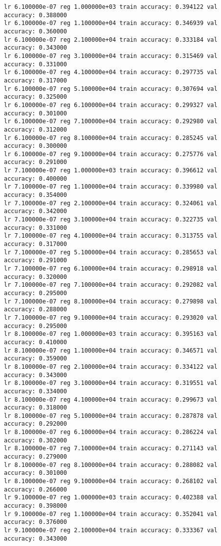 \documentclass[11pt]{article}
\begin{document}
\begin{Verbatim}[commandchars=\\\{\}]
lr 6.100000e-07 reg 1.000000e+03 train accuracy: 0.394122 val accuracy: 0.388000
lr 6.100000e-07 reg 1.100000e+04 train accuracy: 0.346939 val accuracy: 0.360000
lr 6.100000e-07 reg 2.100000e+04 train accuracy: 0.333184 val accuracy: 0.343000
lr 6.100000e-07 reg 3.100000e+04 train accuracy: 0.315469 val accuracy: 0.331000
lr 6.100000e-07 reg 4.100000e+04 train accuracy: 0.297735 val accuracy: 0.317000
lr 6.100000e-07 reg 5.100000e+04 train accuracy: 0.307694 val accuracy: 0.325000
lr 6.100000e-07 reg 6.100000e+04 train accuracy: 0.299327 val accuracy: 0.301000
lr 6.100000e-07 reg 7.100000e+04 train accuracy: 0.292980 val accuracy: 0.312000
lr 6.100000e-07 reg 8.100000e+04 train accuracy: 0.285245 val accuracy: 0.300000
lr 6.100000e-07 reg 9.100000e+04 train accuracy: 0.275776 val accuracy: 0.291000
lr 7.100000e-07 reg 1.000000e+03 train accuracy: 0.396612 val accuracy: 0.400000
lr 7.100000e-07 reg 1.100000e+04 train accuracy: 0.339980 val accuracy: 0.354000
lr 7.100000e-07 reg 2.100000e+04 train accuracy: 0.324061 val accuracy: 0.342000
lr 7.100000e-07 reg 3.100000e+04 train accuracy: 0.322735 val accuracy: 0.331000
lr 7.100000e-07 reg 4.100000e+04 train accuracy: 0.313755 val accuracy: 0.317000
lr 7.100000e-07 reg 5.100000e+04 train accuracy: 0.285653 val accuracy: 0.291000
lr 7.100000e-07 reg 6.100000e+04 train accuracy: 0.298918 val accuracy: 0.320000
lr 7.100000e-07 reg 7.100000e+04 train accuracy: 0.292082 val accuracy: 0.295000
lr 7.100000e-07 reg 8.100000e+04 train accuracy: 0.279898 val accuracy: 0.288000
lr 7.100000e-07 reg 9.100000e+04 train accuracy: 0.293020 val accuracy: 0.295000
lr 8.100000e-07 reg 1.000000e+03 train accuracy: 0.395163 val accuracy: 0.410000
lr 8.100000e-07 reg 1.100000e+04 train accuracy: 0.346571 val accuracy: 0.359000
lr 8.100000e-07 reg 2.100000e+04 train accuracy: 0.334122 val accuracy: 0.343000
lr 8.100000e-07 reg 3.100000e+04 train accuracy: 0.319551 val accuracy: 0.334000
lr 8.100000e-07 reg 4.100000e+04 train accuracy: 0.299673 val accuracy: 0.318000
lr 8.100000e-07 reg 5.100000e+04 train accuracy: 0.287878 val accuracy: 0.292000
lr 8.100000e-07 reg 6.100000e+04 train accuracy: 0.286224 val accuracy: 0.302000
lr 8.100000e-07 reg 7.100000e+04 train accuracy: 0.271143 val accuracy: 0.279000
lr 8.100000e-07 reg 8.100000e+04 train accuracy: 0.288082 val accuracy: 0.301000
lr 8.100000e-07 reg 9.100000e+04 train accuracy: 0.268102 val accuracy: 0.266000
lr 9.100000e-07 reg 1.000000e+03 train accuracy: 0.402388 val accuracy: 0.398000
lr 9.100000e-07 reg 1.100000e+04 train accuracy: 0.352041 val accuracy: 0.376000
lr 9.100000e-07 reg 2.100000e+04 train accuracy: 0.333367 val accuracy: 0.343000

\end{Verbatim}
\end{document}
